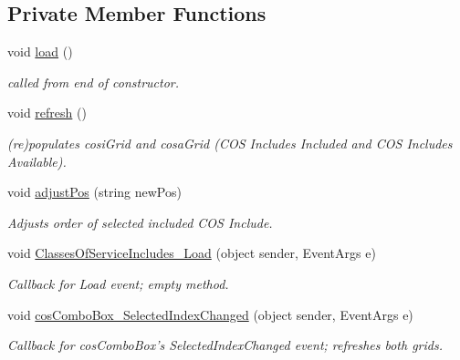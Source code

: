 \subsection*{Private Member Functions}
\begin{DoxyCompactItemize}
\item 
void \hyperlink{class_ias_pbx_config_1_1_classes_of_service_includes_afba25c0ca7c6b26bcd5e8b6984758908}{load} ()
\begin{DoxyCompactList}\small\item\em called from end of constructor. \item\end{DoxyCompactList}\item 
void \hyperlink{class_ias_pbx_config_1_1_classes_of_service_includes_a67961a306356b33f1533714abb1008e1}{refresh} ()
\begin{DoxyCompactList}\small\item\em (re)populates cosiGrid and cosaGrid (COS Includes Included and COS Includes Available). \item\end{DoxyCompactList}\item 
void \hyperlink{class_ias_pbx_config_1_1_classes_of_service_includes_a1a77c41288db274dbe205da6b34ccb1f}{adjustPos} (string newPos)
\begin{DoxyCompactList}\small\item\em Adjusts order of selected included COS Include. \item\end{DoxyCompactList}\item 
void \hyperlink{class_ias_pbx_config_1_1_classes_of_service_includes_ab305108947e8a6f0bfd118ba379ca272}{ClassesOfServiceIncludes\_\-Load} (object sender, EventArgs e)
\begin{DoxyCompactList}\small\item\em Callback for Load event; empty method. \item\end{DoxyCompactList}\item 
void \hyperlink{class_ias_pbx_config_1_1_classes_of_service_includes_a799b3b7cb516a53d3082b9e547630af4}{cosComboBox\_\-SelectedIndexChanged} (object sender, EventArgs e)
\begin{DoxyCompactList}\small\item\em Callback for cosComboBox's SelectedIndexChanged event; refreshes both grids. \item\end{DoxyCompactList}\item 

\end{DoxyCompactItemize}
